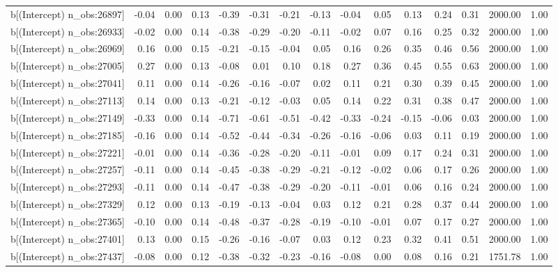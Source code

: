 \begin{table}[ht]
\begin{tabular}{rrrrrrrrrrrrrrr}
  b[(Intercept) n\_obs:26897] & -0.04 & 0.00 & 0.13 & -0.39 & -0.31 & -0.21 & -0.13 & -0.04 & 0.05 & 0.13 & 0.24 & 0.31 & 2000.00 & 1.00 \\ 
  b[(Intercept) n\_obs:26933] & -0.02 & 0.00 & 0.14 & -0.38 & -0.29 & -0.20 & -0.11 & -0.02 & 0.07 & 0.16 & 0.25 & 0.32 & 2000.00 & 1.00 \\ 
  b[(Intercept) n\_obs:26969] & 0.16 & 0.00 & 0.15 & -0.21 & -0.15 & -0.04 & 0.05 & 0.16 & 0.26 & 0.35 & 0.46 & 0.56 & 2000.00 & 1.00 \\ 
  b[(Intercept) n\_obs:27005] & 0.27 & 0.00 & 0.13 & -0.08 & 0.01 & 0.10 & 0.18 & 0.27 & 0.36 & 0.45 & 0.55 & 0.63 & 2000.00 & 1.00 \\ 
  b[(Intercept) n\_obs:27041] & 0.11 & 0.00 & 0.14 & -0.26 & -0.16 & -0.07 & 0.02 & 0.11 & 0.21 & 0.30 & 0.39 & 0.45 & 2000.00 & 1.00 \\ 
  b[(Intercept) n\_obs:27113] & 0.14 & 0.00 & 0.13 & -0.21 & -0.12 & -0.03 & 0.05 & 0.14 & 0.22 & 0.31 & 0.38 & 0.47 & 2000.00 & 1.00 \\ 
  b[(Intercept) n\_obs:27149] & -0.33 & 0.00 & 0.14 & -0.71 & -0.61 & -0.51 & -0.42 & -0.33 & -0.24 & -0.15 & -0.06 & 0.03 & 2000.00 & 1.00 \\ 
  b[(Intercept) n\_obs:27185] & -0.16 & 0.00 & 0.14 & -0.52 & -0.44 & -0.34 & -0.26 & -0.16 & -0.06 & 0.03 & 0.11 & 0.19 & 2000.00 & 1.00 \\ 
  b[(Intercept) n\_obs:27221] & -0.01 & 0.00 & 0.14 & -0.36 & -0.28 & -0.20 & -0.11 & -0.01 & 0.09 & 0.17 & 0.24 & 0.31 & 2000.00 & 1.00 \\ 
  b[(Intercept) n\_obs:27257] & -0.11 & 0.00 & 0.14 & -0.45 & -0.38 & -0.29 & -0.21 & -0.12 & -0.02 & 0.06 & 0.17 & 0.26 & 2000.00 & 1.00 \\ 
  b[(Intercept) n\_obs:27293] & -0.11 & 0.00 & 0.14 & -0.47 & -0.38 & -0.29 & -0.20 & -0.11 & -0.01 & 0.06 & 0.16 & 0.24 & 2000.00 & 1.00 \\ 
  b[(Intercept) n\_obs:27329] & 0.12 & 0.00 & 0.13 & -0.19 & -0.13 & -0.04 & 0.03 & 0.12 & 0.21 & 0.28 & 0.37 & 0.44 & 2000.00 & 1.00 \\ 
  b[(Intercept) n\_obs:27365] & -0.10 & 0.00 & 0.14 & -0.48 & -0.37 & -0.28 & -0.19 & -0.10 & -0.01 & 0.07 & 0.17 & 0.27 & 2000.00 & 1.00 \\ 
  b[(Intercept) n\_obs:27401] & 0.13 & 0.00 & 0.15 & -0.26 & -0.16 & -0.07 & 0.03 & 0.12 & 0.23 & 0.32 & 0.41 & 0.51 & 2000.00 & 1.00 \\ 
  b[(Intercept) n\_obs:27437] & -0.08 & 0.00 & 0.12 & -0.38 & -0.32 & -0.23 & -0.16 & -0.08 & 0.00 & 0.08 & 0.16 & 0.21 & 1751.78 & 1.00 \\ 

\end{tabular}
\end{table}
